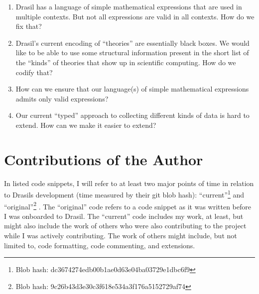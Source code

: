 

\begin{enumerate}

      \item[\namedlabel{rq:lang_division}{RQ1}] Drasil has a language of simple
            mathematical expressions that are used in multiple contexts. But not
            all expressions are valid in all contexts. How do we fix that?

      \item[\namedlabel{rq:modelkinds}{RQ2}] Drasil's current encoding of
            ``theories'' are essentially black boxes. We would like to be able
            to use some structural information present in the short list of the
            ``kinds'' of theories that show up in scientific computing. How do
            we codify that?

      \item[\namedlabel{rq:typing}{RQ3}] How can we ensure that our language(s)
            of simple mathematical expressions admits only valid expressions?

      \item[\namedlabel{rq:chunkdb}{RQ4}] Our current ``typed'' approach to
            collecting different kinds of data is hard to extend. How can we
            make it easier to extend?

\end{enumerate}

\section{Contributions of the Author}
\label{sec:intro:contributions}

In listed code snippets, I will refer to at least two major points of time in
relation to Drasils development (time measured by their git blob hash):
``current''\footnote{Blob hash: dc3674274edb00b1ae0d63e04ba03729e1dbc6f9} and
``original''\footnote{Blob hash: 9c26b43d3e30c3f618e534a3f176a5152729af74}
. The ``original'' code refers
to a code snippet as it was written before I was onboarded to Drasil. The
``current'' code includes my work, at least, but might also include the work of
others who were also contributing to the project while I was actively
contributing. The work of others might include, but not limited to, code
formatting, code commenting, and extensions.

